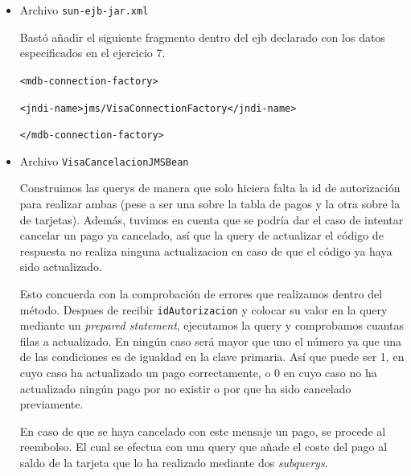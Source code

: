 \documentclass[a4paper, 10pt]{article}
\begin{document}
 	\begin{itemize}

 		\item Archivo \texttt{sun-ejb-jar.xml}

 		Bastó añadir el siguiente fragmento dentro del ejb declarado con los datos especificados en el ejercicio 7.

 		\texttt{<mdb-connection-factory>}

      	\hspace{3em}\texttt{<jndi-name>jms/VisaConnectionFactory</jndi-name>}

      	\texttt{</mdb-connection-factory>}
 		

 		\item Archivo \texttt{VisaCancelacionJMSBean}

 		Construimos las querys de manera que solo hiciera falta la id de autorización para realizar ambas (pese a ser una sobre la tabla de pagos y la otra sobre la de tarjetas). Además, tuvimos en cuenta que se podría dar el caso de intentar cancelar un pago ya cancelado, así que la query de actualizar el código de respuesta no realiza ninguna actualizacion en caso de que el código ya haya sido actualizado.

 		Esto concuerda con la comprobación de errores que realizamos dentro del método. Despues de recibir \texttt{idAutorizacion} y colocar su valor en la query mediante un \textit{prepared statement}, ejecutamos la query y comprobamos cuantas filas a actualizado. En ningún caso será mayor que uno el número ya que una de las condiciones es de igualdad en la clave primaria. Así que puede ser 1, en cuyo caso ha actualizado un pago correctamente, o 0 en cuyo caso no ha actualizado ningún pago por no existir o por que ha sido cancelado previamente.

 		En caso de que se haya cancelado con este mensaje un pago, se procede al reembolso. El cual se efectua con una query que añade el coste del pago al saldo de la tarjeta que lo ha realizado mediante dos \textit{subquerys}.

 	\end{itemize}



\newpage
\end{document}
